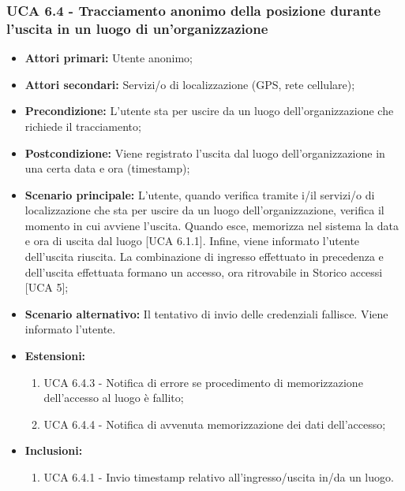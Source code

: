 \subsubsection{UCA 6.4 - Tracciamento anonimo della posizione durante l'uscita in un luogo di un'organizzazione} %
\begin{itemize}
	\item \textbf{Attori primari:} Utente anonimo;
	\item \textbf{Attori secondari:} Servizi/o di localizzazione (GPS, rete cellulare);
	\item \textbf{Precondizione:} L'utente sta per uscire da un luogo dell'organizzazione che richiede il tracciamento;
	\item \textbf{Postcondizione:} Viene registrato l'uscita dal luogo dell'organizzazione in una certa data e ora (timestamp);
	\item \textbf{Scenario principale:} L'utente, quando verifica tramite i/il servizi/o di localizzazione che sta per uscire da un luogo dell'organizzazione, verifica il momento in cui avviene l'uscita. Quando esce, memorizza nel sistema la data e ora di uscita dal luogo [UCA 6.1.1]. Infine, viene informato l'utente dell'uscita riuscita. La combinazione di ingresso effettuato in precedenza e dell'uscita effettuata formano un accesso, ora ritrovabile in Storico accessi [UCA 5];
	\item \textbf{Scenario alternativo:} Il tentativo di invio delle credenziali fallisce. Viene informato l'utente.
	\item \textbf{Estensioni:}
	\begin{enumerate}
		\item UCA 6.4.3 - Notifica di errore se procedimento di memorizzazione dell'accesso al luogo è fallito;
		\item UCA 6.4.4 - Notifica di avvenuta memorizzazione dei dati dell'accesso;
	\end{enumerate}
	\item \textbf{Inclusioni:}
	\begin{enumerate}
		\item UCA 6.4.1 - Invio timestamp relativo all'ingresso/uscita in/da un luogo.
	\end{enumerate}
\end{itemize}